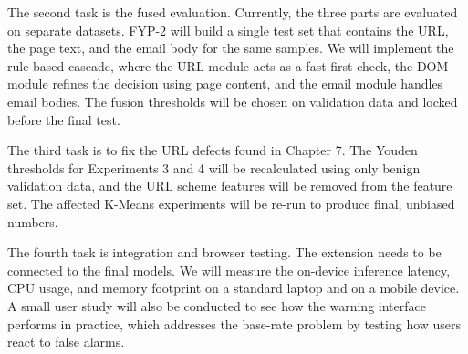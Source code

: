 \documentclass{FastFyp}
\begin{document}
The second task is the fused evaluation. Currently, the three parts are evaluated on separate datasets. FYP-2 will build a single test set that contains the URL, the page text, and the email body for the same samples. We will implement the rule-based cascade, where the URL module acts as a fast first check, the DOM module refines the decision using page content, and the email module handles email bodies. The fusion thresholds will be chosen on validation data and locked before the final test.

The third task is to fix the URL defects found in Chapter 7. The Youden thresholds for Experiments 3 and 4 will be recalculated using only benign validation data, and the URL scheme features will be removed from the feature set. The affected K-Means experiments will be re-run to produce final, unbiased numbers.

The fourth task is integration and browser testing. The extension needs to be connected to the final models. We will measure the on-device inference latency, CPU usage, and memory footprint on a standard laptop and on a mobile device. A small user study will also be conducted to see how the warning interface performs in practice, which addresses the base-rate problem by testing how users react to false alarms.





{


}
\end{document}
